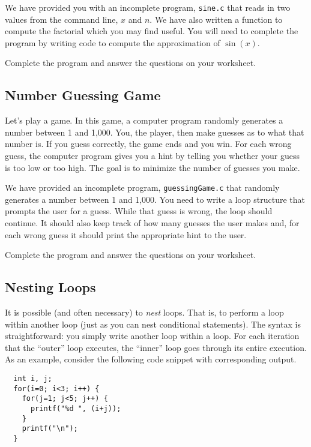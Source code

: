 \documentclass[12pt]{scrartcl}
\begin{document}
We have provided you with an incomplete program, \texttt{sine.c} 
that reads in two values from the command line, $x$ and $n$.  We have also 
written a function to compute the factorial which you may find useful.  
You will need to complete the program by writing code to compute 
the approximation of $\sin(x)$.

Complete the program and answer the questions on your worksheet. 

\subsection{Number Guessing Game}

Let's play a game.  In this game, a computer program randomly 
generates a number between 1 and 1,000.  You, the player, then 
make guesses as to what that number is.  If you guess correctly, 
the game ends and you win.  For each wrong guess, the computer 
program gives you a hint by telling you whether your guess is too 
low or too high.  The goal is to minimize the number of guesses 
you make.

We have provided an incomplete program, \texttt{guessingGame.c} 
that randomly generates a number between 1 and 1,000.  You 
need to write a loop structure that prompts the user for a guess.  
While that guess is wrong, the loop should continue.  It should 
also keep track of how many guesses the user makes and, for 
each wrong guess it should print the appropriate hint to the user.

Complete the program and answer the questions on your worksheet. 

\subsection{Nesting Loops}

It is possible (and often necessary) to \emph{nest} loops.  That is, to 
perform a loop within another loop (just as you can nest conditional 
statements).  The syntax is straightforward: you simply write another 
loop within a loop.  For each iteration that the ``outer'' loop executes, 
the ``inner'' loop goes through its entire execution.  As an example, 
consider the following code snippet with corresponding output.

\begin{verbatim}
  int i, j;
  for(i=0; i<3; i++) {
    for(j=1; j<5; j++) {
      printf("%d ", (i+j));
    }
    printf("\n");
  }
\end{verbatim}
\end{document}
